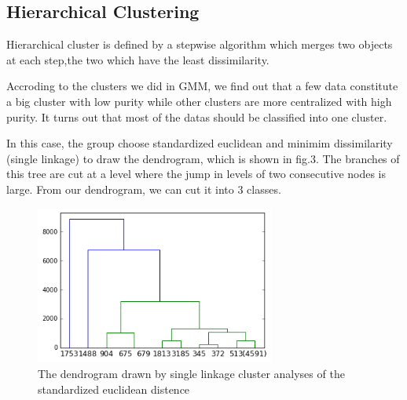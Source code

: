 \subsection{Hierarchical Clustering}

Hierarchical cluster is defined by a stepwise algorithm which merges two objects at each step,the two which have the least dissimilarity.

  
Accroding to the clusters we did in GMM, we find out that a few data constitute a big cluster with low purity while other clusters are more centralized with high purity. It turns out that most of the datas should be classified into one cluster.

In this case, the group choose standardized euclidean and minimim dissimilarity (single linkage) to draw the dendrogram, which is shown in fig.3. The branches of this tree are cut at a level where the jump in levels of two consecutive nodes is large. From our dendrogram, we can cut it into 3 classes.
\begin{figure}[!ht]
	\centering
	\includegraphics[width=0.7\textwidth]{Fig/HC1.png}
	\vspace{-5pt}
	\caption{The dendrogram drawn by single linkage cluster analyses of the standardized euclidean distence}
	\label{fig:HC1}
\end{figure}




